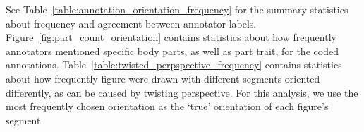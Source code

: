 See Table~\ref{table:annotation_orientation_frequency} for the summary statistics about frequency and agreement between annotator labels.
Figure~\ref{fig:part_count_orientation} contains statistics about how frequently annotators mentioned specific body parts, as well as part trait, for the coded annotations.
Table~\ref{table:twisted_perpspective_frequency} contains statistics about how frequently figure were drawn with different segments oriented differently, as can be caused by twisting perspective. For this analysis, we use the most frequently chosen orientation as the `true' orientation of each figure's segment.
